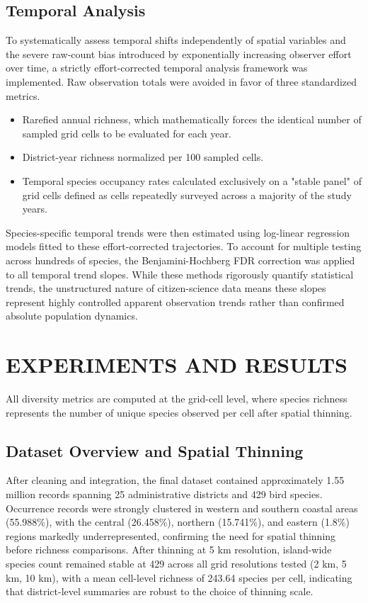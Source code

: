 \documentclass[conference]{IEEEtran}
\begin{document}
\subsection{Temporal Analysis}

To systematically assess temporal shifts independently of spatial variables and the severe raw-count bias introduced by exponentially increasing observer effort over time, a strictly effort-corrected temporal analysis framework was implemented. Raw observation totals were avoided in favor of three standardized metrics.

\begin{itemize}
    \item Rarefied annual richness, which mathematically forces the identical number of sampled grid cells to be evaluated for each year.
    \item District-year richness normalized per 100 sampled cells.
    \item Temporal species occupancy rates calculated exclusively on a "stable panel" of grid cells defined as cells repeatedly surveyed across a majority of the study years. 
\end{itemize}
Species-specific temporal trends were then estimated using log-linear regression models fitted to these effort-corrected trajectories. To account for multiple testing across hundreds of species, the Benjamini-Hochberg FDR correction \cite{ref18} was applied to all temporal trend slopes. While these methods rigorously quantify statistical trends, the unstructured nature of citizen-science data means these slopes represent highly controlled apparent observation trends rather than confirmed absolute population dynamics.

\section{EXPERIMENTS AND RESULTS}

All diversity metrics are computed at the grid-cell level, where species richness represents the number of unique species observed per cell after spatial thinning.

\subsection{Dataset Overview and Spatial Thinning}

After cleaning and integration, the final dataset contained approximately 1.55 million records spanning 25 administrative districts and 429 bird species. Occurrence records were strongly clustered in western and southern coastal areas (55.988\%), with the central (26.458\%), northern (15.741\%), and eastern (1.8\%) regions markedly underrepresented, confirming the need for spatial thinning before richness comparisons. After thinning at 5 km resolution, island-wide species count remained stable at 429 across all grid resolutions tested (2 km, 5 km, 10 km), with a mean cell-level richness of 243.64 species per cell, indicating that district-level summaries are robust to the choice of thinning scale.
\end{document}
